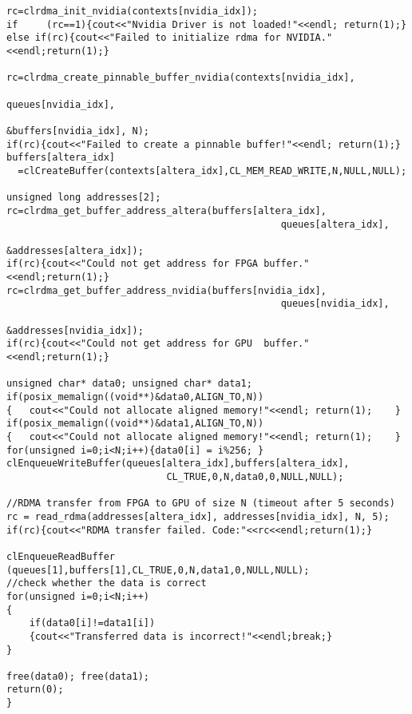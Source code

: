 \begin{lstlisting}
rc=clrdma_init_nvidia(contexts[nvidia_idx]);
if     (rc==1){cout<<"Nvidia Driver is not loaded!"<<endl; return(1);}
else if(rc){cout<<"Failed to initialize rdma for NVIDIA."<<endl;return(1);}

rc=clrdma_create_pinnable_buffer_nvidia(contexts[nvidia_idx], 
                                                      queues[nvidia_idx], 
                                                     &buffers[nvidia_idx], N);
if(rc){cout<<"Failed to create a pinnable buffer!"<<endl; return(1);}
buffers[altera_idx]
  =clCreateBuffer(contexts[altera_idx],CL_MEM_READ_WRITE,N,NULL,NULL);

unsigned long addresses[2];
rc=clrdma_get_buffer_address_altera(buffers[altera_idx], 
                                                queues[altera_idx], 
                                               &addresses[altera_idx]);
if(rc){cout<<"Could not get address for FPGA buffer."<<endl;return(1);}
rc=clrdma_get_buffer_address_nvidia(buffers[nvidia_idx], 
                                                queues[nvidia_idx], 
                                               &addresses[nvidia_idx]);
if(rc){cout<<"Could not get address for GPU  buffer."<<endl;return(1);}

unsigned char* data0; unsigned char* data1;
if(posix_memalign((void**)&data0,ALIGN_TO,N))
{	cout<<"Could not allocate aligned memory!"<<endl; return(1);	}
if(posix_memalign((void**)&data1,ALIGN_TO,N))
{	cout<<"Could not allocate aligned memory!"<<endl; return(1);	}
for(unsigned i=0;i<N;i++){data0[i] = i%256; }
clEnqueueWriteBuffer(queues[altera_idx],buffers[altera_idx],
                            CL_TRUE,0,N,data0,0,NULL,NULL);

//RDMA transfer from FPGA to GPU of size N (timeout after 5 seconds)
rc = read_rdma(addresses[altera_idx], addresses[nvidia_idx], N, 5);
if(rc){cout<<"RDMA transfer failed. Code:"<<rc<<endl;return(1);}

clEnqueueReadBuffer (queues[1],buffers[1],CL_TRUE,0,N,data1,0,NULL,NULL);
//check whether the data is correct
for(unsigned i=0;i<N;i++)
{
	if(data0[i]!=data1[i])
	{cout<<"Transferred data is incorrect!"<<endl;break;}
}

free(data0); free(data1);
return(0);
}





\end{lstlisting}


